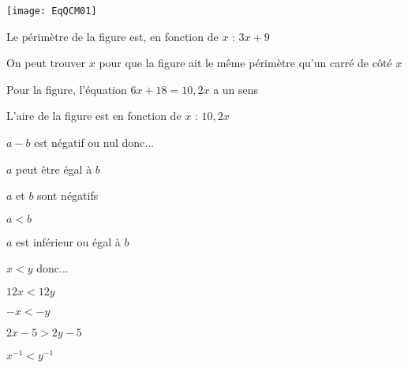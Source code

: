 \newpage



\begin{QCM}
\begin{GroupeQCM}

\begin{exercice}
\phantom{.}

\texttt{[image: EqQCM01]}

\begin{ChoixQCM}{4}
\item Le périmètre de la figure est, en fonction de $x$ : $3x + 9$
\item On peut trouver $x$ pour que la figure  ait le même périmètre qu'un carré de côté $x$
\item Pour la figure, l'équation $6x + 18 = 10,2x$ a un sens
\item L'aire de la figure est en fonction de $x$ : $10,2x$
\end{ChoixQCM}

\begin{corrige}
\end{corrige}
\end{exercice}



\begin{exercice}
$a - b$ est négatif ou nul donc...
\begin{ChoixQCM}{4}
\item $a$ peut être égal à $b$
\item $a$ et $b$ sont négatifs
\item $a < b$
\item $a$ est inférieur ou égal à $b$
\end{ChoixQCM}

\begin{corrige}
\end{corrige}
\end{exercice}





\begin{exercice}
$x < y$ donc...
\begin{ChoixQCM}{4}
\item $12x < 12 y$
\item $-x < -y$
\item $2x - 5 > 2y - 5$
\item $x^{-1} < y^{-1}$
\end{ChoixQCM}


\end{exercice}
\end{GroupeQCM}
\end{QCM}
